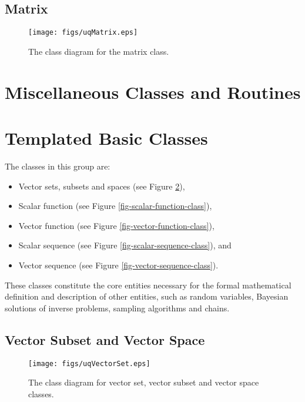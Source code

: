 \clearpage
\subsection{Matrix}

\begin{figure}[h!]
\centerline{
\texttt{[image: figs/uqMatrix.eps]}
}
\caption{
The class diagram for the matrix class.
}
\label{fig-matrix-class}
\end{figure}

\clearpage
\section{Miscellaneous Classes and Routines}

\clearpage
\section{Templated Basic Classes}

The classes in this group are:
\begin{itemize}
\item Vector sets, subsets and spaces (see Figure \ref{fig-vector-space-subset-classes}),
\item Scalar function (see Figure \ref{fig-scalar-function-class}),
\item Vector function (see Figure \ref{fig-vector-function-class}),
\item Scalar sequence (see Figure \ref{fig-scalar-sequence-class}), and
\item Vector sequence (see Figure \ref{fig-vector-sequence-class}).
\end{itemize}
These classes constitute the core entities necessary for the formal
mathematical definition and description of other entities, such as
random variables, Bayesian solutions of inverse problems, sampling algorithms and chains.

\clearpage
\subsection{Vector Subset and Vector Space}

\begin{figure}[h!]
\centerline{
\texttt{[image: figs/uqVectorSet.eps]}
}
\caption{
The class diagram for vector set, vector subset and vector space classes.
}
\label{fig-vector-space-subset-classes}
\end{figure}

